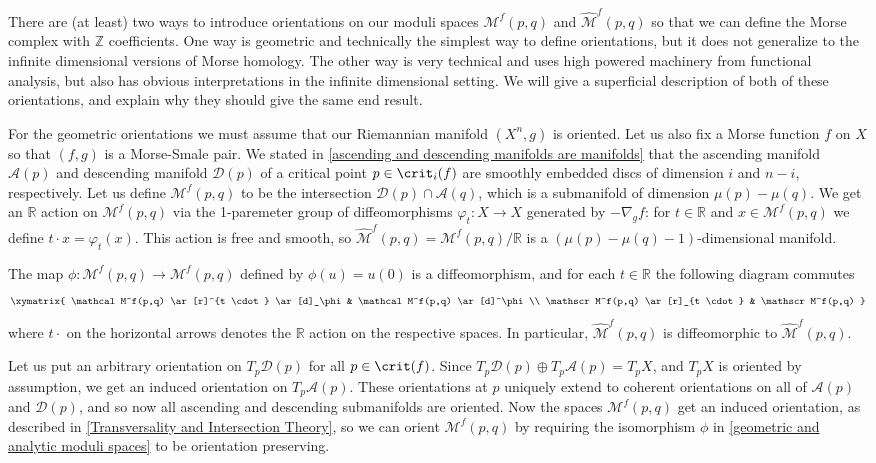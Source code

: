There are (at least) two ways to introduce orientations on our moduli spaces $\mathcal M^f(p,q)$ and $\widehat{\mathcal M}^f(p,q)$ so that we can define the Morse complex with $\mathbb Z$ coefficients. One way is geometric and technically the simplest way to define orientations, but it does not generalize to the infinite dimensional versions of Morse homology. The other way is very technical and uses high powered machinery from functional analysis, but also has obvious interpretations in the infinite dimensional setting. We will give a superficial description of both of these orientations, and explain why they should give the same end result.

For the geometric orientations we must assume that our Riemannian manifold $(X^n,g)$ is oriented. Let us also fix a Morse function $f$ on $X$ so that $(f,g)$ is a Morse-Smale pair. We stated in \cref{ascending and descending manifolds are manifolds} that the ascending manifold $\mathscr A(p)$ and descending manifold $\mathscr D(p)$ of a critical point $p \in \crit_i(f)$ are smoothly embedded discs of dimension $i$ and $n-i$, respectively. Let us define $\mathscr M^f(p,q)$ to be the intersection $\mathscr D(p) \cap \mathscr A(q)$, which is a submanifold of dimension $\mu(p)-\mu(q)$. We get an $\mathbb R$ action on $\mathscr M^f(p,q)$ via the 1-paremeter group of diffeomorphisms $\varphi_t : X \rightarrow X$ generated by $-\nabla_g f$: for $t \in \mathbb R$ and $x \in \mathscr M^f(p,q)$ we define $t \cdot x = \varphi_t(x)$. This action is free and smooth, so $\widehat{\mathscr M}^f(p,q) = \mathscr M^f(p,q)/\mathbb R$ is a $(\mu(p)-\mu(q)-1)$-dimensional manifold.
\begin{prop}
\label{geometric and analytic moduli spaces}
The map $\phi : \mathcal M^f(p,q) \rightarrow \mathscr M^f(p,q)$ defined by $\phi(u)=u(0)$ is a diffeomorphism, and for each $t \in \mathbb R$ the following diagram commutes
\[
\xymatrix
{
	\mathcal M^f(p,q) \ar[r]^{t \cdot} \ar[d]_\phi & \mathcal M^f(p,q) \ar[d]^\phi \\
	\mathscr M^f(p,q) \ar[r]_{t \cdot} & \mathscr M^f(p,q)
}
\]
where $t \cdot$ on the horizontal arrows denotes the $\mathbb R$ action on the respective spaces. In particular, $\widehat{\mathscr M}^f(p,q)$ is diffeomorphic to $\widehat{\mathcal M}^f(p,q)$.
\end{prop}

Let us put an arbitrary orientation on $T_p \mathscr D(p)$ for all $p \in \crit(f)$. Since $T_p \mathscr D(p) \oplus T_p \mathscr A(p) = T_p X$, and $T_p X$ is oriented by assumption, we get an induced orientation on $T_p \mathscr A(p)$. These orientations at $p$ uniquely extend to coherent orientations on all of $\mathscr A(p)$ and $\mathscr D(p)$, and so now all ascending and descending submanifolds are oriented. Now the spaces $\mathscr M^f(p,q)$ get an induced orientation, as described in \cref{Transversality and Intersection Theory}, so we can orient $\mathcal M^f(p,q)$ by requiring the isomorphism $\phi$ in \cref{geometric and analytic moduli spaces} to be orientation preserving.


